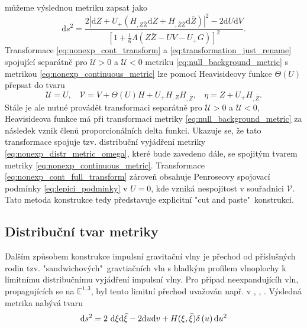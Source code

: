můžeme výslednou metriku zapsat jako
\begin{equation}
    \label{eq:nonexp_continuous_metric}
    \mathrm{d} s^{2}=\frac{2\left|\mathrm{d} Z+U_+\left(H_{, Z \bar{Z}} 
    \mathrm{d} Z+H_{, \bar{Z} \bar{Z}} \mathrm{d} \bar{Z}\right)\right|^{2}-2 \mathrm{d} U 
    \mathrm{d} V}{\left[1+\frac{1}{6} \Lambda(Z \bar{Z}-U V-U_+ G)\right]^{2}}.
\end{equation}
Transformace \eqref{eq:nonexp_cont_transform} a \eqref{eq:transformation_just_rename} spojující separátně pro $\mathcal{U}>0$ a $\mathcal{U}<0$ metriku \eqref{eq:null_background_metric}
s metrikou \eqref{eq:nonexp_continuous_metric} lze pomocí Heavisideovy funkce $\Theta(U)$ přepsat do tvaru 
\begin{equation}
    \label{eq:nonexp_cont_full_transform}
    \mathcal{U}=U,~~~~ \mathcal{V}=V+\Theta(U) H + U_+ H_{,Z}H_{,\bar{Z}},~~~~ \eta=Z+ U_+ H_{,\bar{Z}}.
\end{equation}
Stále je ale nutné provádět transformaci separátně pro $\mathcal{U}>0$ a $\mathcal{U}<0$, Heavisideova funkce
má při transformaci metriky \eqref{eq:null_background_metric} za následek vznik členů proporcionálních delta funkci.
Ukazuje se, že tato transformace spojuje tzv. distribuční vyjádření metriky \eqref{eq:nonexp_distr_metric_omega}, které bude zavedeno dále,
se spojitým tvarem metriky \eqref{eq:nonexp_continuous_metric}.
Transformace \eqref{eq:nonexp_cont_full_transform} zároveň obsahuje Penroseovy spojovací podmínky \eqref{eq:lepici_podminky} v $U=0$, kde
vzniká nespojitost v souřadnici $\mathcal{V}$. Tato metoda konstrukce tedy představuje explicitní "cut and paste"\ konstrukci.


\subsection{Distribuční tvar metriky}
Dalším způsobem konstrukce impulsní gravitační vlny je přechod od příslušných rodin tzv. "sandwichových"\
gravtiačních vln s hladkým profilem vlnoplochy k limitnímu distribučnímu vyjádření impulsní vlny. Pro případ neexpandujícíh vln, propagujících se
na $\mathbb{E}^{1,3}$, byl tento limitní přechod uvažován např. v \cite{Penrose1968TwistorQuant}, \cite{Podolsky_1998}, \cite{Podolsky_1998_nonexpanding}.
Výsledná metrika nabývá tvaru
\begin{equation}
    \mathrm{d} s^2 = 2~ \mathrm{d} \xi \mathrm{d} \bar{\xi} - 2 \mathrm{d} u \mathrm{d} v + H(\xi, \bar{\xi}) \delta\left( u\right) \mathrm{d} u^2
\end{equation}

